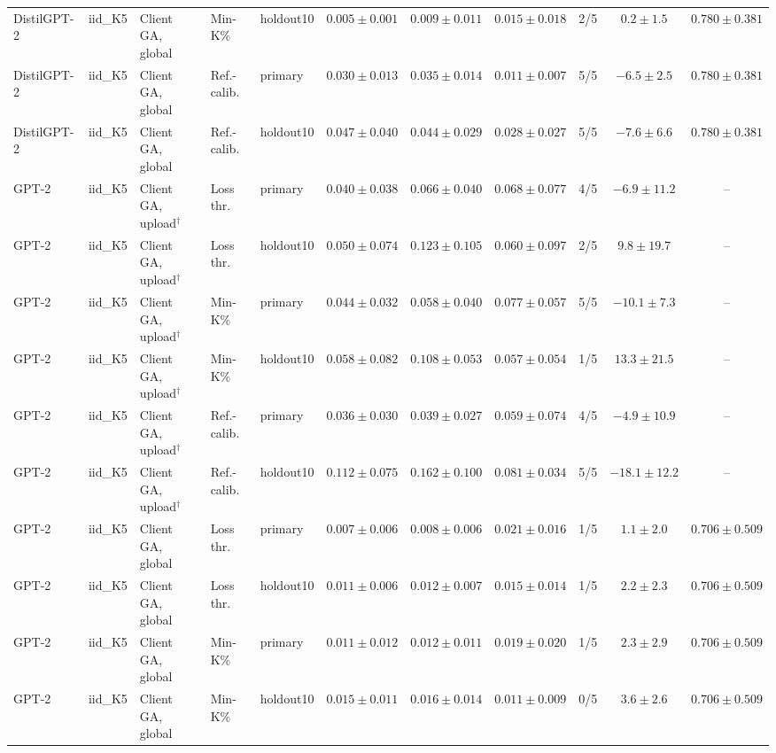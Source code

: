 {\begin{longtable}{@{\extracolsep{\fill}}lllllcccccc@{}}
DistilGPT-2 & iid\_K5 & Client GA, global & Min-K\% & holdout10 & $0.005 \pm 0.001$ & $0.009 \pm 0.011$ & $0.015 \pm 0.018$ & 2/5 & $0.2 \pm 1.5$ & $0.780 \pm 0.381$ \\
DistilGPT-2 & iid\_K5 & Client GA, global & Ref.-calib. & primary & $0.030 \pm 0.013$ & $0.035 \pm 0.014$ & $0.011 \pm 0.007$ & 5/5 & $-6.5 \pm 2.5$ & $0.780 \pm 0.381$ \\
DistilGPT-2 & iid\_K5 & Client GA, global & Ref.-calib. & holdout10 & $0.047 \pm 0.040$ & $0.044 \pm 0.029$ & $0.028 \pm 0.027$ & 5/5 & $-7.6 \pm 6.6$ & $0.780 \pm 0.381$ \\
GPT-2 & iid\_K5 & Client GA, upload$^{\dagger}$ & Loss thr. & primary & $0.040 \pm 0.038$ & $0.066 \pm 0.040$ & $0.068 \pm 0.077$ & 4/5 & $-6.9 \pm 11.2$ & -- \\
GPT-2 & iid\_K5 & Client GA, upload$^{\dagger}$ & Loss thr. & holdout10 & $0.050 \pm 0.074$ & $0.123 \pm 0.105$ & $0.060 \pm 0.097$ & 2/5 & $9.8 \pm 19.7$ & -- \\
GPT-2 & iid\_K5 & Client GA, upload$^{\dagger}$ & Min-K\% & primary & $0.044 \pm 0.032$ & $0.058 \pm 0.040$ & $0.077 \pm 0.057$ & 5/5 & $-10.1 \pm 7.3$ & -- \\
GPT-2 & iid\_K5 & Client GA, upload$^{\dagger}$ & Min-K\% & holdout10 & $0.058 \pm 0.082$ & $0.108 \pm 0.053$ & $0.057 \pm 0.054$ & 1/5 & $13.3 \pm 21.5$ & -- \\
GPT-2 & iid\_K5 & Client GA, upload$^{\dagger}$ & Ref.-calib. & primary & $0.036 \pm 0.030$ & $0.039 \pm 0.027$ & $0.059 \pm 0.074$ & 4/5 & $-4.9 \pm 10.9$ & -- \\
GPT-2 & iid\_K5 & Client GA, upload$^{\dagger}$ & Ref.-calib. & holdout10 & $0.112 \pm 0.075$ & $0.162 \pm 0.100$ & $0.081 \pm 0.034$ & 5/5 & $-18.1 \pm 12.2$ & -- \\
GPT-2 & iid\_K5 & Client GA, global & Loss thr. & primary & $0.007 \pm 0.006$ & $0.008 \pm 0.006$ & $0.021 \pm 0.016$ & 1/5 & $1.1 \pm 2.0$ & $0.706 \pm 0.509$ \\
GPT-2 & iid\_K5 & Client GA, global & Loss thr. & holdout10 & $0.011 \pm 0.006$ & $0.012 \pm 0.007$ & $0.015 \pm 0.014$ & 1/5 & $2.2 \pm 2.3$ & $0.706 \pm 0.509$ \\
GPT-2 & iid\_K5 & Client GA, global & Min-K\% & primary & $0.011 \pm 0.012$ & $0.012 \pm 0.011$ & $0.019 \pm 0.020$ & 1/5 & $2.3 \pm 2.9$ & $0.706 \pm 0.509$ \\
GPT-2 & iid\_K5 & Client GA, global & Min-K\% & holdout10 & $0.015 \pm 0.011$ & $0.016 \pm 0.014$ & $0.011 \pm 0.009$ & 0/5 & $3.6 \pm 2.6$ & $0.706 \pm 0.509$ \\

\end{longtable}}
